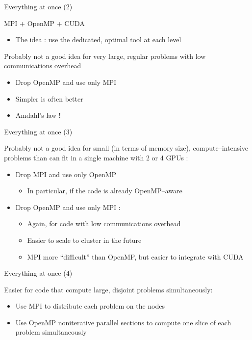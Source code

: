\documentclass{beamer}
\begin{document}
\begin{frame}{Everything at once (2)}
  
  MPI + OpenMP + CUDA
  \begin{itemize}
    \item The idea : use the dedicated, optimal tool at each level
  \end{itemize}

  Probably not a good idea for very large, regular problems 
  with low communications overhead
  \begin{itemize}
  \item Drop OpenMP and use only MPI
  \item Simpler is often better
  \item Amdahl's law !
  \end{itemize}

\end{frame}

\begin{frame}{Everything at once (3)}

  Probably not a good idea for small (in terms of
  memory size), compute--intensive problems than can
  fit in a single machine with 2 or 4 GPUs :
  \begin{itemize}
  \item Drop MPI and use only OpenMP
    \begin{itemize}
    \item In particular, if the code is already OpenMP--aware
    \end{itemize}
  \item Drop OpenMP and use only MPI :
    \begin{itemize}
    \item Again, for code with low communications overhead
    \item Easier to scale to cluster in the future
    \item MPI more ``difficult'' than OpenMP, but easier to integrate
      with CUDA
    \end{itemize}
  \end{itemize}
\end{frame}

\begin{frame}{Everything at once (4)}
  
  Easier for code that compute large, disjoint problems
  simultaneously:
  \begin{itemize}
  \item Use MPI to distribute each problem on the nodes
  \item Use OpenMP noniterative parallel sections to compute
    one slice of each problem simultaneously
  \end{itemize}
\end{frame}
\end{document}
